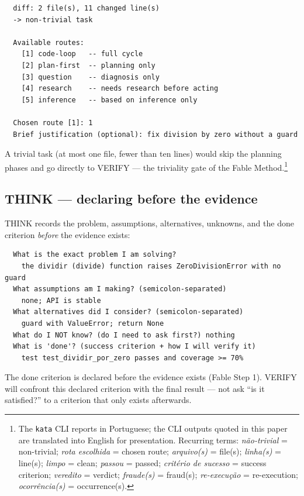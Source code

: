 \documentclass[11pt]{article}
\begin{document}
\begin{lstlisting}
  diff: 2 file(s), 11 changed line(s)
  -> non-trivial task

  Available routes:
    [1] code-loop   -- full cycle
    [2] plan-first  -- planning only
    [3] question    -- diagnosis only
    [4] research    -- needs research before acting
    [5] inference   -- based on inference only

  Chosen route [1]: 1
  Brief justification (optional): fix division by zero without a guard
\end{lstlisting}

A trivial task (at most one file, fewer than ten lines) would skip the
planning phases and go directly to VERIFY --- the triviality gate of the
Fable Method.\footnote{The \texttt{kata} CLI reports in Portuguese; the
CLI outputs quoted in this paper are translated into English for
presentation. Recurring terms: \emph{n\~ao-trivial} = non-trivial;
\emph{rota escolhida} = chosen route; \emph{arquivo(s)} = file(s);
\emph{linha(s)} = line(s); \emph{limpo} = clean; \emph{passou} = passed;
\emph{crit\'erio de sucesso} = success criterion; \emph{veredito} = verdict;
\emph{fraude(s)} = fraud(s); \emph{re-execu\c{c}\~ao} = re-execution;
\emph{ocorr\^encia(s)} = occurrence(s).}

\subsection{THINK --- declaring before the evidence}

THINK records the problem, assumptions, alternatives, unknowns, and the done
criterion \emph{before} the evidence exists:

\begin{lstlisting}
  What is the exact problem I am solving?
    the dividir (divide) function raises ZeroDivisionError with no guard
  What assumptions am I making? (semicolon-separated)
    none; API is stable
  What alternatives did I consider? (semicolon-separated)
    guard with ValueError; return None
  What do I NOT know? (do I need to ask first?) nothing
  What is 'done'? (success criterion + how I will verify it)
    test test_dividir_por_zero passes and coverage >= 70%
\end{lstlisting}

The done criterion is declared before the evidence exists (Fable Step 1).
VERIFY will confront this declared criterion with the final result --- not
ask ``is it satisfied?'' to a criterion that only exists afterwards.
\end{document}
